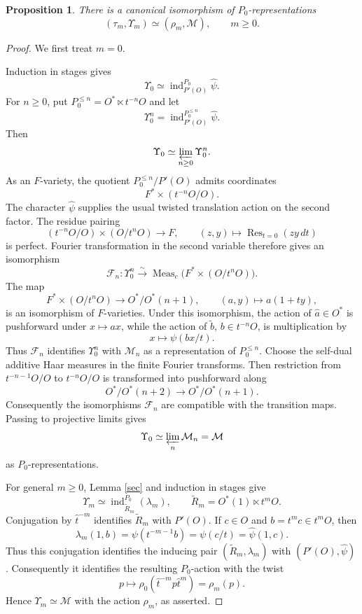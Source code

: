 \documentclass[11pt,a4paper,twoside]{amsart}
\newtheorem{proposition}[theorem]{Proposition}
\theoremstyle{definition}
\theoremstyle{remark}
\newcommand{\bl}{\lambda}
\newcommand{\mcM}{\mathcal M}
\newcommand{\sms}{\smallskip}
\newcommand{\ind}{\operatorname{ind}}
\begin{document}
\begin{proposition}\label{Upsilonm-M}
There is a canonical isomorphism of $P_0$-representations
$$
(\tau_m,\Upsilon_m)\simeq(\rho_m,\mcM),\qquad m\geq0.
$$
\end{proposition}
\begin{proof}
We first treat $m=0$.

\sms

Induction in stages gives
$$
\Upsilon_0\simeq\ind_{P'(O)}^{P_0}\widehat\psi.
$$
For $n\geq0$, put $P_0^{\leq n}=O^*\ltimes t^{-n}O$ and let
$$
\Upsilon_0^n=\ind_{P'(O)}^{P_0^{\leq n}}\widehat\psi.
$$
Then
$$
\Upsilon_0\simeq\varprojlim_{n\geq0}\Upsilon_0^n.
$$
As an $F$-variety, the quotient $P_0^{\leq n}/P'(O)$ admits coordinates
$$
F^*\times(t^{-n}O/O).
$$
The character $\widehat\psi$ supplies the usual twisted translation action on the second factor. The residue pairing
$$
(t^{-n}O/O)\times(O/t^nO)\longrightarrow F,\qquad
(z,y)\longmapsto\operatorname{Res}_{t=0}(zy\,dt)
$$
is perfect. Fourier transformation in the second variable therefore gives an isomorphism
$$
\mathcal F_n:\Upsilon_0^n\stackrel{\sim}{\longrightarrow}
\operatorname{Meas}_c\bigl(F^*\times(O/t^nO)\bigr).
$$
The map
$$
F^*\times(O/t^nO)\longrightarrow O^*/O^*(n+1),\qquad
(a,y)\longmapsto a(1+ty),
$$
is an isomorphism of $F$-varieties. Under this isomorphism, the action of $\widehat a\in O^*$ is pushforward under $x\mapsto ax$, while the action of $\widetilde b$, $b\in t^{-n}O$, is multiplication by
$$
x\longmapsto\psi(bx/t).
$$
Thus $\mathcal F_n$ identifies $\Upsilon_0^n$ with $\mcM_n$ as a representation of $P_0^{\leq n}$.
Choose the self-dual additive Haar measures in the finite Fourier transforms. Then restriction from $t^{-n-1}O/O$ to $t^{-n}O/O$ is transformed into pushforward along
$$
O^*/O^*(n+2)\longrightarrow O^*/O^*(n+1).
$$
Consequently the isomorphisms $\mathcal F_n$ are compatible with the transition maps. Passing to projective limits gives
$$
\Upsilon_0\simeq\varprojlim_n\mcM_n=\mcM
$$
as $P_0$-representations.

For general $m\geq0$, Lemma \ref{sec} and induction in stages give
$$
\Upsilon_m\simeq\ind_{\widetilde R_m}^{P_0}(\bl_m),
\qquad \widetilde R_m=O^*(1)\ltimes t^mO.
$$
Conjugation by $\widehat t^{-m}$ identifies $\widetilde R_m$ with $P'(O)$. If $c\in O$ and $b=t^mc\in t^mO$, then
$$
\bl_m(1,b)=\psi(t^{-m-1}b)=\psi(c/t)=\widehat\psi(1,c).
$$
Thus this conjugation identifies the inducing pair $(\widetilde R_m,\bl_m)$ with $(P'(O),\widehat\psi)$. Consequently it identifies the resulting $P_0$-action with the twist
$$
p\longmapsto\rho_0(\widehat t^{-m}p\widehat t^m)=\rho_m(p).
$$
Hence $\Upsilon_m\simeq\mcM$ with the action $\rho_m$, as asserted.
\end{proof}
\end{document}
